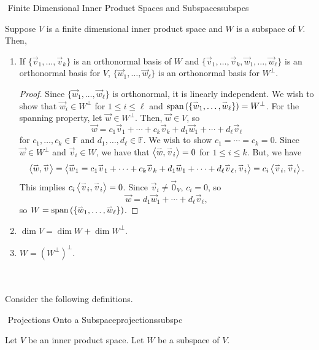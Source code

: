         \begin{theorem}{\Stop\,\,Finite Dimensional Inner Product Spaces and Subspaces}{subspcs}
            
            Suppose \(V\) is a finite dimensional inner product space and \(W\) is a subspace of \(V\). Then,
            \begin{enumerate}
                \item If \(\{\vec{v}_1,\ldots,\vec{v}_k\}\) is an orthonormal basis of \(W\) and \(\{\vec{v}_1,\ldots,\vec{v}_k,\vec{w}_1,\ldots,\vec{w}_{\ell}\}\) is an orthonormal basis for \(V\), \(\{\vec{w}_1,\ldots,\vec{w}_{\ell}\}\) is an orthonormal basis for \(W^\perp\).
                \begin{proof}
                    Since \(\{\vec{w}_1,\ldots,\vec{w}_{\ell}\}\) is orthonormal, it is linearly independent. We wish to show that \(\vec{w}_i\in W^\perp\) for \(1\leq i \leq \ell\) and \(\text{span\,}(\{\overset{_{\rightharpoonup}}{w}_1,\ldots,\overset{_{\rightharpoonup}}{w}_\ell\})=W^\perp\). For the spanning property, let \(\vec{w}\in W^\perp\). Then, \(\vec{w}\in V\), so
                    \begin{equation*}
                        \vec{w}=c_1\vec{v}_1+\cdots+c_k\vec{v}_k+d_1\vec{w}_1+\cdots+d_\ell\vec{v}_\ell
                    \end{equation*}
                    for \(c_1,\ldots,c_k\in\mathbb{F}\) and \(d_1,\ldots,d_\ell\in\mathbb{F}\). We wish to show \(c_1=\cdots=c_k=0\). Since \(\vec{w}\in W^\perp\) and \(\vec{v}_i\in W\), we have that \(\left\langle \overset{_{\rightharpoonup}}{w},\overset{_{\rightharpoonup}}{v}_i\right\rangle=0\) for \(1\leq i\leq k\). But, we have
                    \begin{equation*}
                        \left\langle \overset{_{\rightharpoonup}}{w},\overset{_{\rightharpoonup}}{v}\right\rangle=\left\langle \overset{_{\rightharpoonup}}{w}_1=c_1\overset{_{\rightharpoonup}}{v}_1+\cdots+c_k\overset{_{\rightharpoonup}}{v}_k+d_1\overset{_{\rightharpoonup}}{w}_1+\cdots+d_\ell\overset{_{\rightharpoonup}}{v}_\ell,\overset{_{\rightharpoonup}}{v}_i\right\rangle=c_i\left\langle \overset{_{\rightharpoonup}}{v}_i,\overset{_{\rightharpoonup}}{v}_i\right\rangle.
                    \end{equation*}
                    This implies \(c_i\left\langle \overset{_{\rightharpoonup}}{v}_i,\overset{_{\rightharpoonup}}{v}_i\right\rangle=0\). Since \(\vec{v}_i\neq\vec{0}_V\), \(c_i=0\), so
                    \begin{equation*}
                        \vec{w}=d_1\vec{w}_1+\cdots+d_\ell\vec{v}_\ell,
                    \end{equation*}
                    so \(W=\text{span\,}(\{\overset{_{\rightharpoonup}}{w}_1,\ldots,\overset{_{\rightharpoonup}}{w}_\ell\})\).
                \end{proof}
                \item \(\dim V=\dim W+\dim W^\perp\).
                \item \(W=(W^\perp)^\perp\).
            \end{enumerate}

        \end{theorem}
        \pagebreak
        \vphantom
        \\
        \\
        Consider the following definitions.
        \begin{definition}{\Stop\,\,Projections Onto a Subspace}{projectionssubspc}

            Let \(V\) be an inner product space. Let \(W\) be a subspace of \(V\).
            
        \end{definition}
        \DOTHISLATER
        \DOTHISLATER